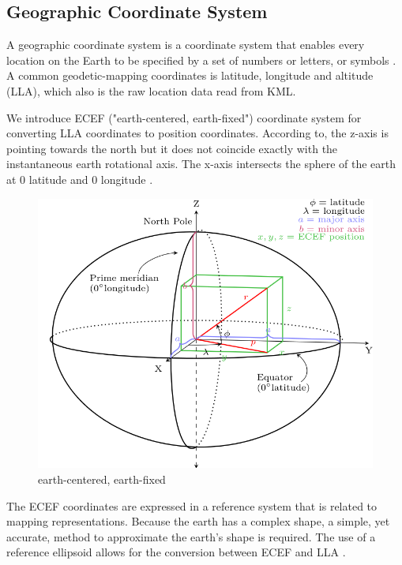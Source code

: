 \subsection{Geographic Coordinate System}

A geographic coordinate system is a coordinate system that enables every location on the Earth to be specified by a set of numbers or letters, or symbols \parencite{wiki.geographic-coordinate-system.2016}. A common geodetic-mapping coordinates is latitude, longitude and altitude (LLA), which also is the raw location data read from KML.

We introduce ECEF ("earth-centered, earth-fixed") coordinate system for converting  LLA coordinates to position coordinates. According to, the z-axis is pointing towards the north but it does not coincide exactly with the instantaneous earth rotational axis. The x-axis intersects the sphere of the earth at $0$ latitude and $0$ longitude \parencite{wiki.ecef.2016}.

\begin{figure}[H]
\centering
\includegraphics[width=\linewidth]{Figures/ecef.png}
\decoRule
\caption[ecef]{earth-centered, earth-fixed \parencite{wiki.ecef.2016}}
\end{figure}

The ECEF coordinates are expressed in a reference system that is related to mapping representations. Because the earth has a complex shape, a simple, yet accurate, method to approximate the earth’s shape is required. The use of a reference ellipsoid allows for the conversion between ECEF and LLA \parencite{u-blox.datum.1999}.

